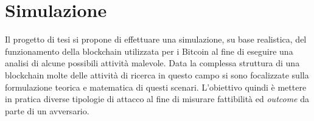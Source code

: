 \chapter{Simulazione}

Il progetto di tesi si propone di effettuare una simulazione, su base realistica, del funzionamento della blockchain utilizzata per i Bitcoin al fine di eseguire una analisi di alcune possibili attività malevole.\newline
Data la complessa struttura di una blockchain molte delle attività di ricerca in questo campo si sono focalizzate sulla formulazione teorica e matematica di questi scenari. L'obiettivo quindi è mettere in pratica diverse tipologie di attacco al fine di misurare fattibilità ed \textit{outcome} da parte di un avversario.\newlin\newline


